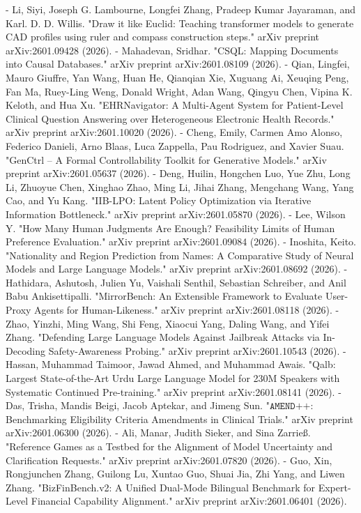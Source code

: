 - Li, Siyi, Joseph G. Lambourne, Longfei Zhang, Pradeep Kumar Jayaraman, and Karl. D. D. Willis. "Draw it like Euclid: Teaching transformer models to generate CAD profiles using ruler and compass construction steps." arXiv preprint arXiv:2601.09428 (2026).
- Mahadevan, Sridhar. "CSQL: Mapping Documents into Causal Databases." arXiv preprint arXiv:2601.08109 (2026).
- Qian, Lingfei, Mauro Giuffre, Yan Wang, Huan He, Qianqian Xie, Xuguang Ai, Xeuqing Peng, Fan Ma, Ruey-Ling Weng, Donald Wright, Adan Wang, Qingyu Chen, Vipina K. Keloth, and Hua Xu. "EHRNavigator: A Multi-Agent System for Patient-Level Clinical Question Answering over Heterogeneous Electronic Health Records." arXiv preprint arXiv:2601.10020 (2026).
- Cheng, Emily, Carmen Amo Alonso, Federico Danieli, Arno Blaas, Luca Zappella, Pau Rodriguez, and Xavier Suau. "GenCtrl -- A Formal Controllability Toolkit for Generative Models." arXiv preprint arXiv:2601.05637 (2026).
- Deng, Huilin, Hongchen Luo, Yue Zhu, Long Li, Zhuoyue Chen, Xinghao Zhao, Ming Li, Jihai Zhang, Mengchang Wang, Yang Cao, and Yu Kang. "IIB-LPO: Latent Policy Optimization via Iterative Information Bottleneck." arXiv preprint arXiv:2601.05870 (2026).
- Lee, Wilson Y. "How Many Human Judgments Are Enough? Feasibility Limits of Human Preference Evaluation." arXiv preprint arXiv:2601.09084 (2026).
- Inoshita, Keito. "Nationality and Region Prediction from Names: A Comparative Study of Neural Models and Large Language Models." arXiv preprint arXiv:2601.08692 (2026).
- Hathidara, Ashutosh, Julien Yu, Vaishali Senthil, Sebastian Schreiber, and Anil Babu Ankisettipalli. "MirrorBench: An Extensible Framework to Evaluate User-Proxy Agents for Human-Likeness." arXiv preprint arXiv:2601.08118 (2026).
- Zhao, Yinzhi, Ming Wang, Shi Feng, Xiaocui Yang, Daling Wang, and Yifei Zhang. "Defending Large Language Models Against Jailbreak Attacks via In-Decoding Safety-Awareness Probing." arXiv preprint arXiv:2601.10543 (2026).
- Hassan, Muhammad Taimoor, Jawad Ahmed, and Muhammad Awais. "Qalb: Largest State-of-the-Art Urdu Large Language Model for 230M Speakers with Systematic Continued Pre-training." arXiv preprint arXiv:2601.08141 (2026).
- Das, Trisha, Mandis Beigi, Jacob Aptekar, and Jimeng Sun. "$\texttt{AMEND++}$: Benchmarking Eligibility Criteria Amendments in Clinical Trials." arXiv preprint arXiv:2601.06300 (2026).
- Ali, Manar, Judith Sieker, and Sina Zarrieß. "Reference Games as a Testbed for the Alignment of Model Uncertainty and Clarification Requests." arXiv preprint arXiv:2601.07820 (2026).
- Guo, Xin, Rongjunchen Zhang, Guilong Lu, Xuntao Guo, Shuai Jia, Zhi Yang, and Liwen Zhang. "BizFinBench.v2: A Unified Dual-Mode Bilingual Benchmark for Expert-Level Financial Capability Alignment." arXiv preprint arXiv:2601.06401 (2026).
